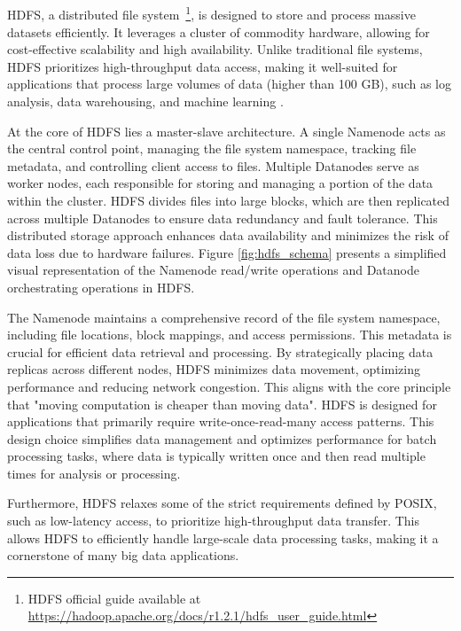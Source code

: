 \subsection{}
\gls{HDFS}, a distributed file system~\footnote{\gls{HDFS} official guide available at \url{https://hadoop.apache.org/docs/r1.2.1/hdfs_user_guide.html}}, is designed to store and process massive datasets efficiently. It leverages a cluster of commodity hardware, allowing for cost-effective scalability and high availability. Unlike traditional file systems, \gls{HDFS} prioritizes high-throughput data access, making it well-suited for applications that process large volumes of data (higher than 100 GB), such as log analysis, data warehousing, and machine learning \cite{kalakarunReviewHadoopHDFS2013}.

At the core of \gls{HDFS} lies a master-slave architecture. A single Namenode acts as the central control point, managing the file system namespace, tracking file metadata, and controlling client access to files. Multiple Datanodes serve as worker nodes, each responsible for storing and managing a portion of the data within the cluster. \gls{HDFS} divides files into large blocks, which are then replicated across multiple Datanodes to ensure data redundancy and fault tolerance. This distributed storage approach enhances data availability and minimizes the risk of data loss due to hardware failures. Figure \ref{fig:hdfs_schema} presents a simplified visual representation of the Namenode read/write operations and Datanode orchestrating operations in \gls{HDFS}.

The Namenode maintains a comprehensive record of the file system namespace, including file locations, block mappings, and access permissions. This metadata is crucial for efficient data retrieval and processing. By strategically placing data replicas across different nodes, \gls{HDFS} minimizes data movement, optimizing performance and reducing network congestion. This aligns with the core principle that "moving computation is cheaper than moving data". \gls{HDFS} is designed for applications that primarily require write-once-read-many access patterns. This design choice simplifies data management and optimizes performance for batch processing tasks, where data is typically written once and then read multiple times for analysis or processing.

Furthermore, \gls{HDFS} relaxes some of the strict requirements defined by POSIX, such as low-latency access, to prioritize high-throughput data transfer. This allows \gls{HDFS} to efficiently handle large-scale data processing tasks, making it a cornerstone of many big data applications.

